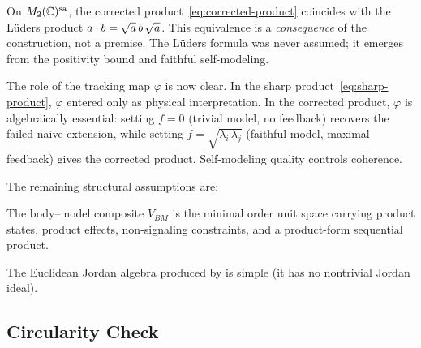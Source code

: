 \documentclass[11pt]{article}
\begin{document}
\begin{remark}
  On $\Mnsa{2}$, the corrected
  product~\eqref{eq:corrected-product} coincides with the L\"uders
  product $\sp{a}{b} = \sqrt{a}\, b\, \sqrt{a}$.  This equivalence
  is a \emph{consequence} of the construction, not a premise.  The
  L\"uders formula was never assumed; it emerges from the positivity
  bound and faithful self-modeling.
\end{remark}

\begin{remark}
  The role of the tracking map $\varphi$ is now clear.  In the sharp
  product~\eqref{eq:sharp-product}, $\varphi$ entered only as
  physical interpretation.  In the corrected product, $\varphi$ is
  algebraically essential: setting $f = 0$ (trivial model, no
  feedback) recovers the failed naive extension, while setting
  $f = \sqrt{\lambda_{i}\, \lambda_{j}}$ (faithful model, maximal
  feedback) gives the corrected product.  Self-modeling quality
  controls coherence.
\end{remark}

The remaining structural assumptions are:

\begin{assumption}\label{ass:minimal}
  The body--model composite $V_{BM}$ is the minimal order unit space
  carrying product states, product effects, non-signaling constraints,
  and a product-form sequential product.
\end{assumption}

\begin{assumption}\label{ass:simple}
  The Euclidean Jordan algebra produced by  is simple
  (it has no nontrivial Jordan ideal).
\end{assumption}


\subsection{Circularity Check}
\label{sec:circularity}
\end{document}
